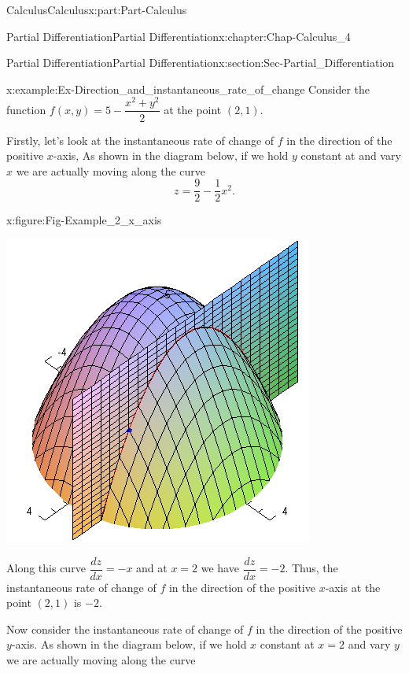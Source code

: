 \documentclass[oneside,10pt,]{book}
\numberwithin{equation}{section}
\begin{document}
\begin{partptx}{Calculus}{}{Calculus}{}{}{x:part:Part-Calculus}
\begin{chapterptx}{Partial Differentiation}{}{Partial Differentiation}{}{}{x:chapter:Chap-Calculus_4}
\begin{sectionptx}{Partial Differentiation}{}{Partial Differentiation}{}{}{x:section:Sec-Partial_Differentiation}
\begin{example}{}{x:example:Ex-Direction_and_instantaneous_rate_of_change}%
Consider the function \(f(x,y) = 5 - \dfrac{x^2+y^2}{2}\) at the point \((2,1)\).%
\par
Firstly, let’s look at the instantaneous rate of change of \(f\) in the direction of the positive \(x\)-axis, As shown in the diagram below, if we hold \(y\) constant at and vary \(x\) we are actually moving along the curve%
\begin{equation*}
z=\frac{9}{2}-\frac{1}{2}x^2\text{.}
\end{equation*}
%
\begin{figureptx}{}{x:figure:Fig-Example_2_x_axis}{}%
\begin{image}{0.15}{0.7}{0.15}%
\includegraphics[width=\linewidth]{./Calculus/Images/4/Ex2_x_axis_rate_of_change.png}
\end{image}%
\tcblower
\end{figureptx}%
Along this curve \(\dfrac{dz}{dx}=-x\) and at \(x=2\) we have \(\dfrac{dz}{dx}=-2\). Thus, the instantaneous rate of change of \(f\) in the direction of the positive \(x\)-axis at the point \((2,1)\) is \(-2\).%
\par
Now consider the instantaneous rate of change of \(f\) in the direction of the positive \(y\)-axis. As shown in the diagram below, if we hold \(x\) constant at \(x=2\) and vary \(y\) we are actually moving along the curve%

\end{example}
\end{sectionptx}
\end{chapterptx}
\end{partptx}
\end{document}
